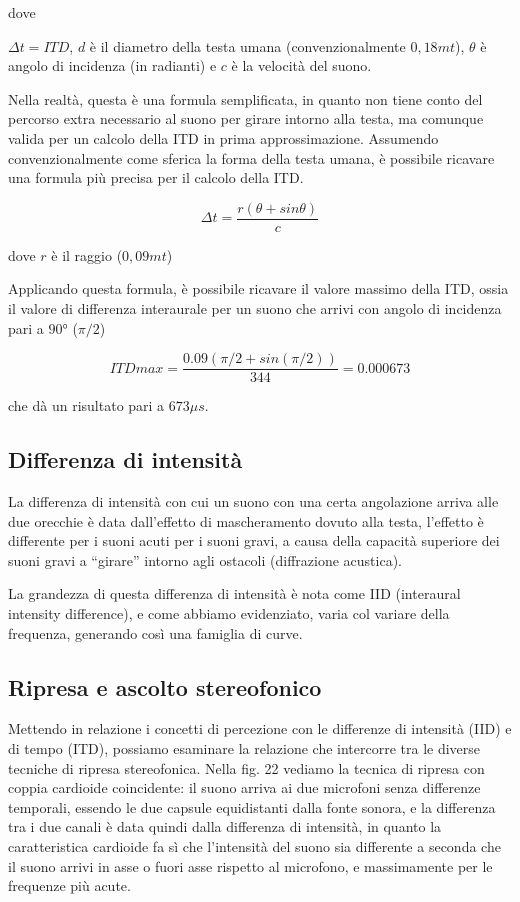 {dove

$\Delta t = ITD$, $d$ è il diametro della testa umana (convenzionalmente $0,18mt$),
$\theta$ è angolo di incidenza (in radianti) e $c$ è la velocità del suono.

Nella realtà, questa è una formula semplificata, in quanto non tiene conto del
percorso extra necessario al suono per girare intorno alla testa, ma comunque
valida per un calcolo della ITD in prima approssimazione. Assumendo
convenzionalmente come sferica la forma della testa umana, è possibile ricavare
una formula più precisa per il calcolo della ITD.

\begin{equation}
\Delta t = \frac{r (\theta + sin\theta)}{c}
\end{equation}

dove $r$ è il raggio ($0,09mt$)

Applicando questa formula, è possibile ricavare il valore massimo della ITD,
ossia il valore di differenza interaurale per un suono che arrivi con angolo
di incidenza pari a $90°$ ($\pi/2$)

\begin{equation}
ITDmax = \frac{0.09 (\pi/2 + sin(\pi/2))}{344} = 0.000673
\end{equation}

che dà un risultato pari a $673μs$.

\subsection{Differenza di intensità}

La differenza di intensità con cui un suono con una certa angolazione arriva
alle due orecchie è data dall’effetto di mascheramento dovuto alla testa,
l’effetto è differente per i suoni acuti
per i suoni gravi, a causa della capacità superiore dei suoni gravi a “girare”
intorno agli ostacoli (diffrazione acustica).

La grandezza di questa differenza di intensità è nota come IID (interaural
intensity difference), e come abbiamo evidenziato, varia col variare della
frequenza, generando così una famiglia di curve.

\subsection{Ripresa e ascolto stereofonico}

Mettendo in relazione i concetti di percezione con le differenze di intensità
(IID) e di tempo (ITD), possiamo esaminare la relazione che intercorre tra le
diverse tecniche di ripresa stereofonica. Nella fig. 22 vediamo la tecnica di
ripresa con coppia cardioide coincidente: il suono arriva ai due microfoni
senza differenze temporali, essendo le due capsule equidistanti dalla fonte
sonora, e la differenza tra i due canali è data quindi dalla differenza di
intensità, in quanto la caratteristica cardioide fa sì che l’intensità del suono
sia differente a seconda che il suono arrivi in asse o fuori asse rispetto al
microfono, e massimamente per le frequenze più acute.

}
